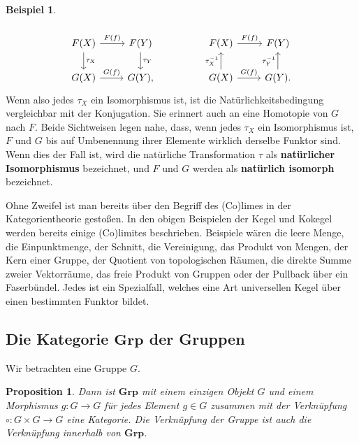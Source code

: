 \documentclass[leqno]{article}
\theoremstyle{plain}
\newtheorem{prop}[thm]{Proposition}
\theoremstyle{definition}
\newtheorem{exmp}{Beispiel}[section]
\theoremstyle{remark}
\begin{document}
\begin{exmp}
\begin{enumerate}
\begin{equation}
	\end{equation}
	\vspace{-0,5cm}
	\begin{equation}
		\begin{tikzcd}
		F(X) \arrow[r, "F(f)"] \arrow[d, "\tau_X"] & F(Y) \arrow[d, "\tau_Y"] &  & F(X) \arrow[r, "F(f)"] & F(Y)                           \\
		G(X) \arrow[r, "G(f)"]                     & {G(Y),}                  &  & G(X) \arrow[u, "\tau_X^{-1}"] \arrow[r, "G(f)"]       & G(Y). \arrow[u, "\tau_Y^{-1}"]
		\end{tikzcd}
	\end{equation}
	Wenn also jedes $\tau_X$ ein Isomorphismus ist, ist die Natürlichkeitsbedingung vergleichbar mit der Konjugation. Sie erinnert auch an eine Homotopie von $G$ nach $F$. Beide Sichtweisen legen nahe, dass, wenn jedes $\tau_X$ ein Isomorphismus ist, $F$ und $G$ bis auf Umbenennung ihrer Elemente wirklich derselbe Funktor sind. Wenn dies der Fall ist, wird die natürliche Transformation $\tau$ als \textbf{natürlicher Isomorphismus} bezeichnet, und $F$ und $G$ werden als \textbf{natürlich isomorph} bezeichnet.
\end{enumerate}
\end{exmp}

Ohne Zweifel ist man bereits über den Begriff des (Co)limes in der Kategorientheorie gestoßen. In den obigen Beispielen der Kegel und Kokegel werden bereits einige (Co)limites beschrieben. Beispiele wären die leere Menge, die Einpunktmenge, der Schnitt, die Vereinigung, das Produkt von Mengen, der Kern einer Gruppe, der Quotient von topologischen Räumen, die direkte Summe zweier Vektorräume, das freie Produkt von Gruppen oder der Pullback über ein Faserbündel. Jedes ist ein Spezialfall, welches eine Art universellen Kegel über einen bestimmten Funktor bildet.

\subsection{Die Kategorie $\textbf{Grp}$ der Gruppen}
Wir betrachten eine Gruppe $G$.

\begin{prop}
Dann ist $\textbf{Grp}$ mit einem einzigen Objekt $G$ und einem Morphismus $g: G \rightarrow G$ für jedes Element $g \in G$ zusammen mit der Verknüpfung $\circ: G \times G \rightarrow G$ eine Kategorie. Die Verknüpfung der Gruppe ist auch die Verknüpfung innerhalb von $\textbf{Grp}$.
\end{prop}
\end{document}
